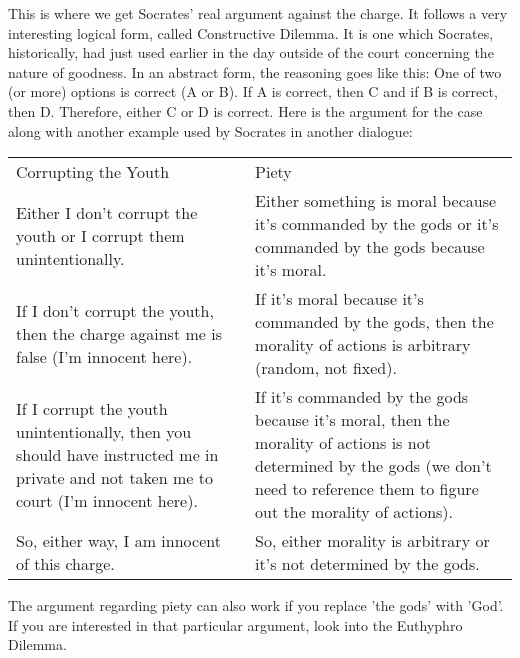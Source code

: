 This is where we get Socrates' real argument against the charge. It follows a very interesting logical form, called Constructive Dilemma. It is one which Socrates, historically, had just used earlier in the day outside of the court concerning the nature of goodness. In an abstract form, the reasoning goes like this: One of two (or more) options is correct (A or B). If A is correct, then  C and if B is correct, then D. Therefore, either C or D is correct. Here is the argument for the case along with another example used by Socrates in another dialogue:
\begin{tabular}{p{2in}|p{2in}}
Corrupting the Youth& Piety\\

    Either I don't corrupt the youth or I corrupt them unintentionally.&Either something is moral because it's commanded by the gods or it's commanded by the gods because it's moral.\\
    If I don't corrupt the youth, then the charge against me is false (I'm innocent here).&If it's moral because it's commanded by the gods, then the morality of actions is arbitrary (random, not fixed).\\
    If I corrupt the youth unintentionally, then you should have instructed me in private and not taken me to court (I'm innocent here).&If it's commanded by the gods because it's moral, then the morality of actions is not determined by the gods (we don't need to reference them to figure out the morality of actions).\\
    So, either way, I am innocent of this charge.&  So, either morality is arbitrary or it's not determined by the gods.\\
\end{tabular}

The argument regarding piety can also work if you replace 'the gods' with 'God'. If you are interested in that particular argument, look into the Euthyphro Dilemma.